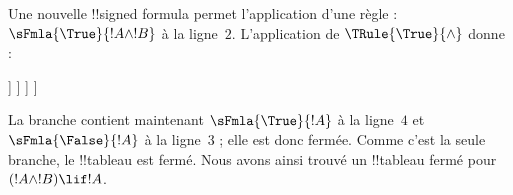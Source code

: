\documentclass[11pt,a4paper,openany]{memoir}
\begin{document}
\begin{ex}
Une nouvelle !!{signed formula} permet l'application d'une règle :
$\sFmla{\True}{!A \land !B}$ à la ligne~$2$. L'application de
$\TRule{\True}{\land}$ donne :
\begin{oltableau}
  [\sFmla{\False}{(\formula{A} \land \formula{B}) \lif \formula{A}},
    checked, just = \TAss
    [\sFmla{\True}{\formula{A} \land \formula{B}},
      just={\TRule{\False}{\lif}[1]}, checked
      [\sFmla{\False}{\formula{A}}, just={\TRule{\False}{\lif}[1]}
        [\sFmla{\True}{\formula{A}}, just={\TRule{\True}{\land}[2]}
          [\sFmla{\True}{\formula{B}}, just={\TRule{\True}{\land}[2]}, close
          ]
        ]
      ]
    ]
  ]
\end{oltableau}
La branche contient maintenant $\sFmla{\True}{!A}$ à la ligne~$4$ et
$\sFmla{\False}{!A}$ à la ligne~$3$ ; elle est donc fermée. Comme c'est
la seule branche, le !!{tableau} est fermé. Nous avons ainsi trouvé un
!!{tableau} fermé pour~$(!A \land !B) \lif !A$.
\end{ex}
\end{document}
